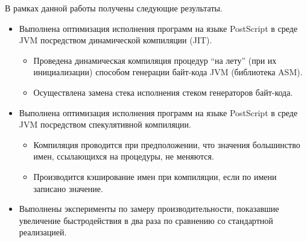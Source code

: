 	В рамках данной работы получены следующие результаты.
	\begin{itemize}
		\item Выполнена оптимизация исполнения программ на языке PostScript в среде JVM посредством динамической компиляции (JIT).
		\begin{itemize}
			\item Проведена динамическая компиляция процедур ``на лету'' (при их инициализации) способом генерации байт-кода JVM (библиотека ASM).
			\item Осуществлена замена стека исполнения стеком генераторов байт-кода.
		\end{itemize}
		\item Выполнена оптимизация исполнения программ на языке PostScript в среде JVM посредством спекулятивной компиляции.
		\begin{itemize}
			\item Компиляция проводится при предположении, что значения большинство имен, ссылающихся на процедуры, не меняются.
			\item Производится кэширование имен при компиляции, если по имени записано значение.
		\end{itemize}
		\item  Выполнены эксперименты по замеру производительности, показавшие увеличение быстродействия в два раза по сравнению со стандартной реализацией. 
	\end{itemize}
	
